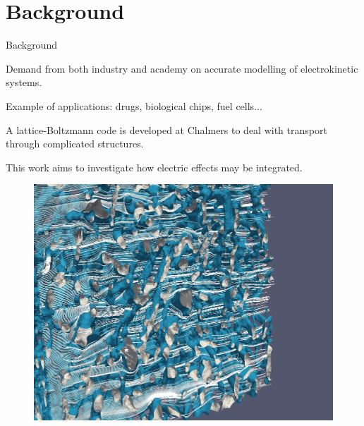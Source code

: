 \section{Background}

\begin{frame}{Background}


\begin{itemize*}
\item Demand from both industry and academy on accurate modelling of
  electrokinetic systems.
\item Example of applications: drugs, biological chips, fuel cells...
\item A lattice-Boltzmann code is developed at Chalmers to deal with
  transport through complicated structures.
\item This work aims to investigate how electric effects may be integrated.
\end{itemize*}


\end{frame}

\begin{frame}[plain]
\begin{figure}
\begin{center}
\includegraphics[width=1.0\textwidth]{fig/diffusion_w4.jpg}
\end{center}
\end{figure}
\end{frame}
